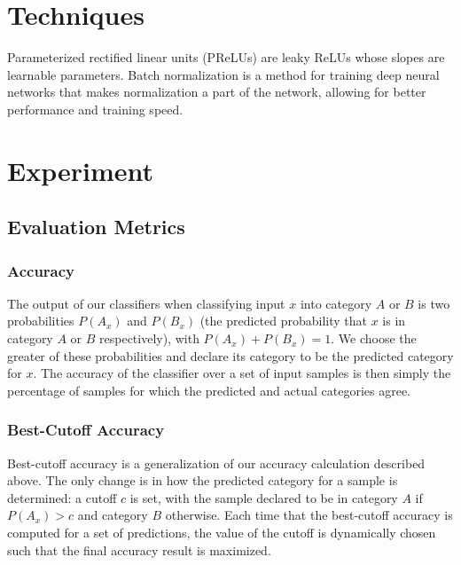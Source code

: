 \documentclass{article} %
\begin{document}
\section{Techniques} \label{section:techniques}
Parameterized rectified linear units (PReLUs) \cite{DBLP:journals/corr/HeZR015} are leaky ReLUs whose slopes are learnable parameters.
Batch normalization \cite{DBLP:journals/corr/IoffeS15} is a method for training deep neural networks that makes normalization a part of the network, allowing for better performance and training speed.

\section{Experiment} \label{section:experiment}
\subsection{Evaluation Metrics}
\subsubsection{Accuracy}
The output of our classifiers when classifying input $x$ into category $A$ or $B$ is two probabilities $P(A_x)$ and $P(B_x)$ (the predicted probability that $x$ is in category $A$ or $B$ respectively), with $P(A_x)+P(B_x)=1$.  We choose the greater of these probabilities and declare its category to be the predicted category for $x$.  The accuracy of the classifier over a set of input samples is then simply the percentage of samples for which the predicted and actual categories agree.
\subsubsection{Best-Cutoff Accuracy}
Best-cutoff accuracy is a generalization of our accuracy calculation described above.  The only change is in how the predicted category for a sample is determined: a cutoff $c$ is set, with the sample declared to be in category $A$ if $P(A_x) > c$ and category $B$ otherwise.  Each time that the best-cutoff accuracy is computed for a set of predictions, the value of the cutoff is dynamically chosen such that the final accuracy result is maximized.
\end{document}
